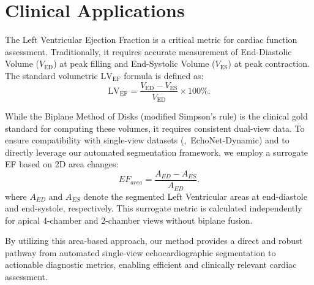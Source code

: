 \section{Clinical Applications}
      \label{sec:clinical_application}

\noindent 
The Left Ventricular Ejection Fraction is a critical metric for cardiac function assessment.
Traditionally, it requires accurate measurement of End-Diastolic Volume ($V_{\text{ED}}$) at peak filling and End-Systolic Volume ($V_{\text{ES}}$) at peak contraction.
The standard volumetric $\text{LV}_{\text{EF}}$ formula is defined as:
\begin{equation*}
   \text{LV}_{\text{EF}} = \frac{V_{\text{ED}} - V_{\text{ES}}}{V_{\text{ED}}} \times 100\%.
   \label{eq:lvef}
\end{equation*}

While the Biplane Method of Disks (modified Simpson's rule) is the clinical gold standard for computing these volumes, it requires consistent dual-view data.
To ensure compatibility with single-view datasets (\eg,~EchoNet-Dynamic) and to directly leverage our automated segmentation framework, we employ a surrogate EF based on 2D area changes:
\begin{equation*}
   EF_{area} = \frac{A_{ED} - A_{ES}}{A_{ED}}.
   \label{eq:ef_area}
\end{equation*}
where $A_{ED}$ and $A_{ES}$ denote the segmented Left Ventricular areas at end-diastole and end-systole, respectively.
This surrogate metric is calculated independently for apical 4-chamber and 2-chamber views without biplane fusion.

By utilizing this area-based approach, our method provides a direct and robust pathway from automated single-view echocardiographic segmentation to actionable diagnostic metrics, enabling efficient and clinically relevant cardiac assessment.